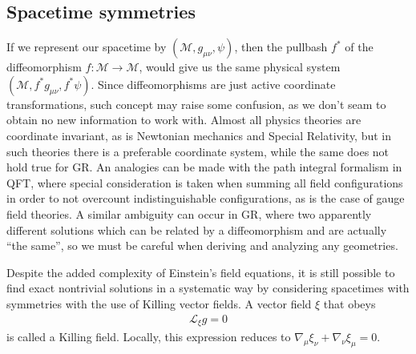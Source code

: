 \subsection{Spacetime symmetries}

If we represent our spacetime by $(\mathcal{M}, g_{\mu\nu}, \psi)$, then the pullbash $f^*$ of the diffeomorphism $f:\mathcal{M}\rightarrow\mathcal{M}$, would give us the same physical system $(\mathcal{M}, f^* g_{\mu\nu}, f^* \psi)$.
Since diffeomorphisms are just active coordinate transformations, such concept may raise some confusion, as we don't seam to obtain no new information to work with. 
Almost all physics theories are coordinate invariant, as is Newtonian mechanics and Special Relativity, but in such theories there is a preferable coordinate system, while the same does not hold true for GR.
An analogies can be made with the path integral formalism in QFT, where special consideration is taken when summing all field configurations in order to not overcount indistinguishable configurations, as is the case of gauge field theories.
A similar ambiguity can occur in GR, where two apparently different solutions which can be related by a diffeomorphism and are actually ``the same'', so we must be careful when deriving and analyzing any geometries.

Despite the added complexity of Einstein's field equations, it is still possible to find exact nontrivial solutions in a systematic way by considering spacetimes with symmetries with the use of Killing vector fields.
A vector field $\xi$ that obeys
\begin{align}
    \mathcal{L}_\xi  g = 0  
    \label{eq2:killing}
\end{align}
is called a Killing field. Locally, this expression reduces to $\nabla_\mu \xi_\nu + \nabla_\nu \xi_\mu = 0$.

